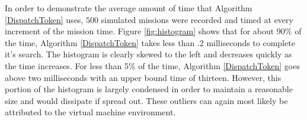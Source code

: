 In order to demonstrate the average amount of time that Algorithm
\ref{DispatchToken} uses, $500$ simulated missions were recorded and timed
at every increment of the mission time. Figure \ref{fig:histogram} shows that for about
90\% of the time, Algorithm \ref{DispatchToken} takes less than .2
milliseconds to complete it's search. The histogram is clearly skewed
to the left and decreases quickly as the time increases.  For less than 5\%
of the time, Algorithm \ref{DispatchToken} goes above two
milliseconds with an upper bound time of thirteen. However, this
portion of the histogram is largely condensed in order to maintain a
reasonable size and would dissipate if spread out. These outliers can again 
most likely be attributed to the virtual machine environment.

